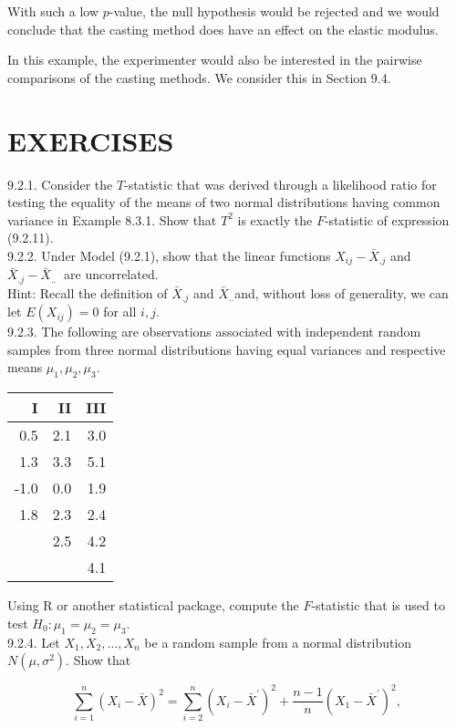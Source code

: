 With such a low $p$-value, the null hypothesis would be rejected and we would conclude that the casting method does have an effect on the elastic modulus.

In this example, the experimenter would also be interested in the pairwise comparisons of the casting methods. We consider this in Section 9.4.

\section*{EXERCISES}
9.2.1. Consider the $T$-statistic that was derived through a likelihood ratio for testing the equality of the means of two normal distributions having common variance in Example 8.3.1. Show that $T^{2}$ is exactly the $F$-statistic of expression (9.2.11).\\
9.2.2. Under Model (9.2.1), show that the linear functions $X_{i j}-\bar{X}_{. j}$ and $\bar{X}_{. j}-\bar{X}_{\text {.. }}$ are uncorrelated.\\
Hint: Recall the definition of $\bar{X}_{. j}$ and $\bar{X}_{. .}$and, without loss of generality, we can let $E\left(X_{i j}\right)=0$ for all $i, j$.\\
9.2.3. The following are observations associated with independent random samples from three normal distributions having equal variances and respective means $\mu_{1}, \mu_{2}, \mu_{3}$.

\begin{center}
\begin{tabular}{rrr}
\hline
I & II & III \\
\hline
0.5 & 2.1 & 3.0 \\
1.3 & 3.3 & 5.1 \\
-1.0 & 0.0 & 1.9 \\
1.8 & 2.3 & 2.4 \\
 & 2.5 & 4.2 \\
 &  & 4.1 \\
\hline
\end{tabular}
\end{center}

Using R or another statistical package, compute the $F$-statistic that is used to test $H_{0}: \mu_{1}=\mu_{2}=\mu_{3}$.\\
9.2.4. Let $X_{1}, X_{2}, \ldots, X_{n}$ be a random sample from a normal distribution $N\left(\mu, \sigma^{2}\right)$. Show that

$$
\sum_{i=1}^{n}\left(X_{i}-\bar{X}\right)^{2}=\sum_{i=2}^{n}\left(X_{i}-\bar{X}^{\prime}\right)^{2}+\frac{n-1}{n}\left(X_{1}-\bar{X}^{\prime}\right)^{2},
$$


